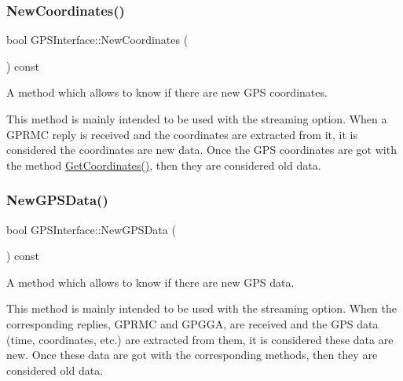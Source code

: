 \subsubsection{\texorpdfstring{New\+Coordinates()}{NewCoordinates()}}
{\footnotesize\ttfamily bool G\+P\+S\+Interface\+::\+New\+Coordinates (\begin{DoxyParamCaption}{ }\end{DoxyParamCaption}) const\hspace{0.3cm}{\ttfamily [inline]}}



A method which allows to know if there are new G\+PS coordinates. 

This method is mainly intended to be used with the streaming option. When a G\+P\+R\+MC reply is received and the coordinates are extracted from it, it is considered the coordinates are new data. Once the G\+PS coordinates are got with the method \hyperlink{classGPSInterface_a21b7fb470d3e3641f9456a249e7df492}{Get\+Coordinates()}, then they are considered old data. \mbox{\label{classGPSInterface_a5972705822baff825ef090a99b215f55}} 
\subsubsection{\texorpdfstring{New\+G\+P\+S\+Data()}{NewGPSData()}}
{\footnotesize\ttfamily bool G\+P\+S\+Interface\+::\+New\+G\+P\+S\+Data (\begin{DoxyParamCaption}{ }\end{DoxyParamCaption}) const\hspace{0.3cm}{\ttfamily [inline]}}



A method which allows to know if there are new G\+PS data. 

This method is mainly intended to be used with the streaming option. When the corresponding replies, G\+P\+R\+MC and G\+P\+G\+GA, are received and the G\+PS data (time, coordinates, etc.) are extracted from them, it is considered these data are new. Once these data are got with the corresponding methods, then they are considered old data. \mbox{\label{classGPSInterface_a9d8395626efc9a191ff2635c486dbd56}} 
